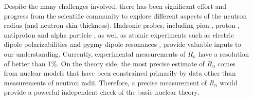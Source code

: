 Despite the many challenges involved, there has been significant effort and progress from 
the scientific community to explore different aspects of the neutron radius (and neutron skin thickness).
Hadronic probes, including pion \cite{ALLARDYCE19731}, proton \cite{LOMBARDI1972103,PhysRevC.82.044611}, 
antiproton \cite{PhysRevC.76.014311} and alpha particle \cite{KRASZNAHORKAY2004224},
as well as atomic experiments such as electric dipole polarizabilities \cite{Roca_Maza_2012} and 
pygmy dipole resonances \cite{PhysRevC.88.044610}, provide valuable inputs to our understanding.
Currently, experimental measurements of $R_n$ have a resolution of better than 1\%.
On the theory side, the most precise estimate of $R_n$ comes from nuclear models
that have been constrained primarily by data other than measurements	%
of neutron radii. Therefore, a precise measurement of $R_n$ would provide a powerful 
independent check of the basic nuclear theory.
\begin{comment}
\item proton
    \begin{itemize}
	\item high-energy polarized proton
	\item Relativistic Impulse Approximation (RIA) with free nucleon-nucleon interaction
    \end{itemize}
\item pion
    \begin{itemize}
	\item in the $\Delta(1332)$ region, $\pi^- N$ interaction is 3 times larger than $\pi^- p$.
	\item strong absorption at the surface, sensitive to the tail of neutron distributions;
	    increase pion energy to reduce cross section
	\item applicable to only light stable nuclei
    \end{itemize}
\item antiproton
    \begin{itemize}
	\item slow antiproton capture (like an electron)
    \end{itemize}
\item PVES
\item GDR: Giant Dipole Resonance
\item SDR: Spin-Dipole Resonance
\end{comment}

